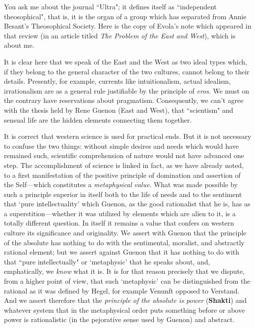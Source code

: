 You ask me about the journal ``Ultra"; it defines itself as ``independent theosophical", that is, it is the organ of a group which has separated from Annie Besant's Theosophical Society. Here is the copy of Evola's note which appeared in that review (in an article titled \emph{The Problem of the East and West}), which is about me.

\begin{quotex}
It is clear here that we speak of the East and the West as two ideal types which, if they belong to the general character of the two cultures, cannot belong to their details. Presently, for example, currents like intuitionalism, actual idealism, irrationalism are as a general rule justifiable by the principle of \emph{eros}. We must on the contrary have reservations about pragmatism. Consequently, we can't agree with the thesis held by Rene Guenon (East and West), that ``scientism" and sensual life are the hidden elements connecting them together.

It is correct that western science is used for practical ends. But it is not necessary to confuse the two things: without simple desires and needs which would have remained such, scientific comprehension of nature would not have advanced one step. The accomplishment of science is linked in fact, as we have already noted, to a first manifestation of the positive principle of domination and assertion of the Self—which constitutes a \emph{metaphysical value}. What was made possible by such a principle superior in itself both to the life of needs and to the sentiment that `pure intellectuality' which Guenon, as the good rationalist that he is, has as a superstition—whether it was utilized by elements which are alien to it, is a totally different question. In itself it remains a value that confers on western culture its significance and originality. We assert with Guenon that the principle of the absolute has nothing to do with the sentimental, moralist, and abstractly rational element; but we assert against Guenon that it has nothing to do with that ``pure intellectually" or `metaphysic' that he speaks about, and, emphatically, we \emph{know} what it is. It is for that reason precisely that we dispute, from a higher point of view, that such `metaphysic' can be distinguished from the rational as it was defined by Hegel, for example Venunft opposed to Verstand. And we assert therefore that the \emph{principle of the absolute is power} (\textbf{Shakti}) and whatever system that in the metaphysical order puts something before or above power is rationalistic (in the pejorative sense used by Guenon) and abstract. 

\end{quotex}
